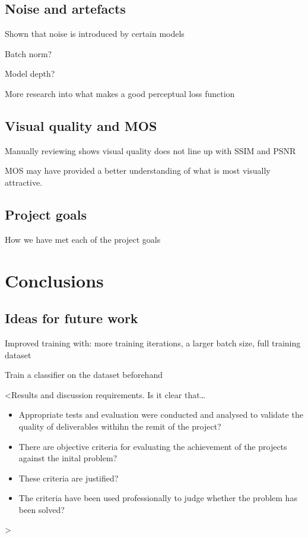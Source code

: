 \subsection{Noise and artefacts}
Shown that noise is introduced by certain models

Batch norm?

Model depth?

More research into what makes a good perceptual loss function

\subsection{Visual quality and MOS}
Manually reviewing shows visual quality does not line up with SSIM and PSNR

MOS may have provided a better understanding of what is most visually attractive.

\subsection{Project goals}
How we have met each of the project goals

\section{Conclusions}

\subsection{Ideas for future work}
Improved training with: more training iterations, a larger batch size, full training dataset

Train a classifier on the dataset beforehand

<Results and discussion requirements. Is it clear that\dots
\begin{itemize}
    \item Appropriate tests and evaluation were conducted and analysed to validate the quality of deliverables withihn the remit of the project?
    \item There are objective criteria for evaluating the achievement of the projects against the inital problem?
    \item These criteria are justified?
    \item The criteria have been used professionally to judge whether the problem has been solved?
\end{itemize}
>